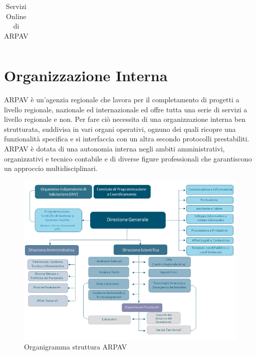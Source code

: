 \begin{longtable}{p{}|p{}}
\caption{Servizi Online di ARPAV}
\end{longtable}

\newpage

\section{Organizzazione Interna}

ARPAV è un'agenzia regionale che lavora per il completamento di progetti a livello regionale, nazionale ed internazionale ed offre tutta una serie di servizi a livello regionale e non. Per fare ciò necessita di una  organizzazione interna ben strutturata, suddivisa in vari organi operativi, ognuno dei quali ricopre una funzionalità specifica e si interfaccia con un altra secondo protocolli prestabiliti. ARPAV è dotata di una autonomia interna negli ambiti amministrativi, organizzativi e tecnico contabile e di diverse figure professionali che garantiscono un approccio multidisciplinari.

\begin{figure}[htbp]
\centering
\includegraphics[scale=0.7]{./capitoli/capitolo1/img/organigramma}

\caption{Organigramma struttura ARPAV}

\end{figure}

